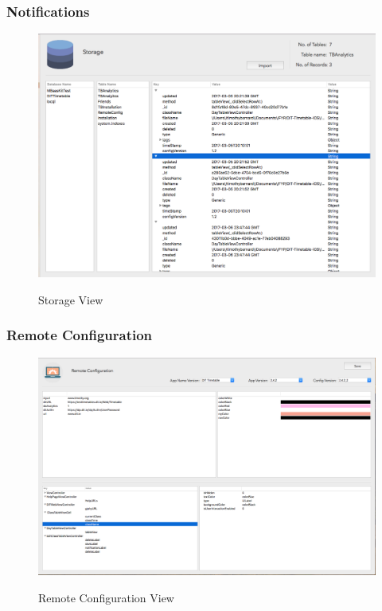 \subsubsection{Notifications}

\begin{figure}[!h]
    \caption{Storage View}
    \centering
    \includegraphics[width=120mm]{images/dashboard/storage}
    \label{fig:staff}
\end{figure} 

\subsubsection{Remote Configuration}

\begin{figure}[!h]
    \caption{Remote Configuration View}
    \centering
    \includegraphics[width=150mm]{images/dashboard/remote-config}
    \label{fig:remote-config-view}
\end{figure}

